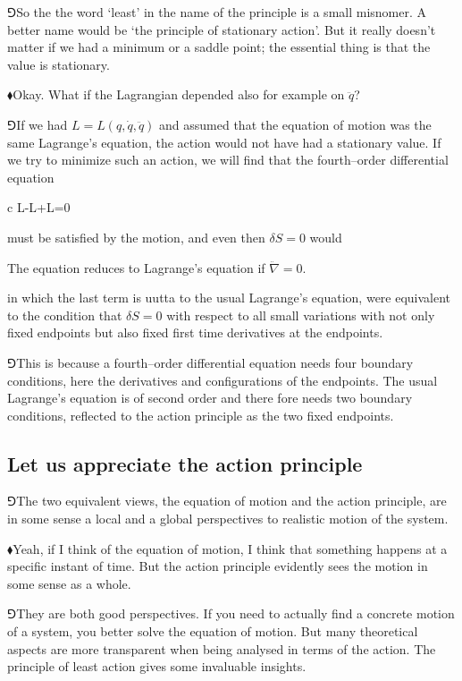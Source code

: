 \documentclass[11pt,oneside%
]{memoir}
\newenvironment{eqna}{\begin{IEEEeqnarray*}{c}}{\end{IEEEeqnarray*}\ignorespacesafterend}
\newcommand{\der}[2]{\frac{\dd#1}{\dd#2}}
\newcommand{\dd}{\mathrm{d}}
\newcommand{\hea}{\(\blacklozenge\)\;}
\newcommand{\heb}{\(\Game\)\;}
\begin{document}
\heb So the the word `least' in the name of the principle is a small misnomer. A better name would be `the principle of stationary action'. But it really doesn't matter if we had a minimum or a saddle point; the essential thing is that the value is stationary.

\hea Okay. What if the Lagrangian depended also for example on \(\ddot{q}\)?

\heb If we had \(L=L(q,\dot{q},\ddot{q})\) and assumed that the equation of motion was the same Lagrange's equation, the action would not have had a stationary value. If we try to minimize such an action, we will find that the fourth--order differential equation
\begin{eqna}
    \nabla L-\der{}{t}\dot{\nabla}L+\der{^2}{t^2}\ddot{\nabla}L=0
\end{eqna}
must be satisfied by the motion, and even then \(\delta S=0\) would 

The equation reduces to Lagrange's equation if \(\ddot{\nabla}=0\).


in which the last term is uutta to the usual Lagrange's equation, were equivalent to the condition that \(\delta S=0\) with respect to all small variations with not only fixed endpoints but also fixed first time derivatives at the endpoints.

\heb This is because a fourth--order differential equation needs four boundary conditions, here the derivatives and configurations of the endpoints. The usual Lagrange's equation is of second order and there fore needs two boundary conditions, reflected to the action principle as the two fixed endpoints.
\subsection{Let us appreciate the action principle}
\heb The two equivalent views, the equation of motion and the action principle, are in some sense a local and a global perspectives to realistic motion of the system.

\hea Yeah, if I think of the equation of motion, I think that something happens at a specific instant of time. But the action principle evidently sees the motion in some sense as a whole.

\heb They are both good perspectives. If you need to actually find a concrete motion of a system, you better solve the equation of motion. But many theoretical aspects are more transparent when being analysed in terms of the action. The principle of least action gives some invaluable insights.
\end{document}
